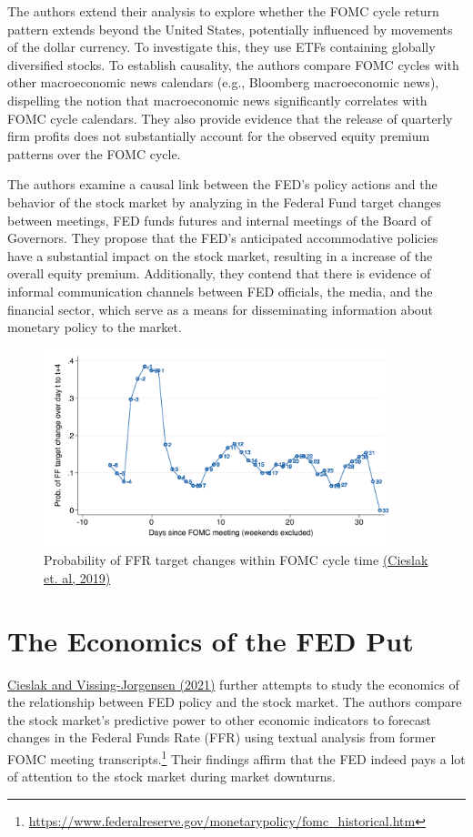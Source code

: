 The authors extend their analysis to explore whether the FOMC cycle return pattern extends beyond the United States, potentially influenced by movements of the dollar currency. To investigate this, they use ETFs containing globally diversified stocks. To establish causality, the authors compare FOMC cycles with other macroeconomic news calendars (e.g., Bloomberg macroeconomic news), dispelling the notion that macroeconomic news significantly correlates with FOMC cycle calendars. They also provide evidence that the release of quarterly firm profits does not substantially account for the observed equity premium patterns over the FOMC cycle.

The authors examine a causal link between the FED's policy actions and the behavior of the stock market by analyzing in the Federal Fund target changes between meetings,  FED funds futures and internal meetings of the Board of Governors. They propose that the FED's anticipated accommodative policies have a substantial impact on the stock market, resulting in a increase of the overall equity premium.  Additionally, they contend that there is evidence of informal communication channels between FED officials, the media, and the financial sector, which serve as a means for disseminating information about monetary policy to the market.

\begin{figure}[h]
    \centering
    \label{cies19_fig3A}
    \includegraphics[width=0.9\textwidth]{figures/cies19/fig3A}
    \caption{Probability of FFR target changes within FOMC cycle time  \hyperref[item:cieslak_stock_2019]{(Cieslak et. al, 2019)}}
\end{figure}

\pagebreak

\section{The Economics of the FED Put}
\hyperref[item:cieslak_economics_2021]{Cieslak and Vissing-Jorgensen (2021)} further attempts to study the economics of the relationship between FED policy and the stock market. The authors compare the stock market's predictive power to other economic indicators to forecast changes in the Federal Funds Rate (FFR) using textual analysis from former FOMC meeting transcripts.\footnote{\url{https://www.federalreserve.gov/monetarypolicy/fomc_historical.htm}} Their findings affirm that the FED indeed pays a lot of attention to the stock market during market downturns.


